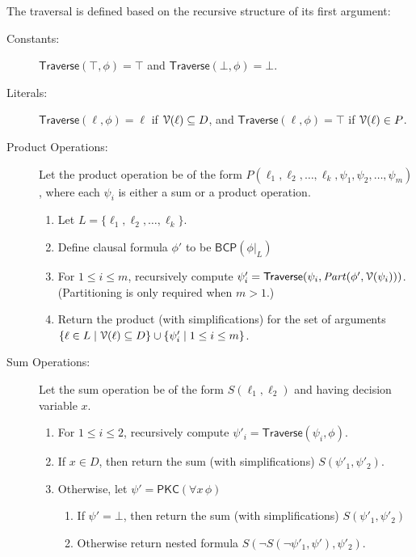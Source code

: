 \documentclass[letterpaper,USenglish,cleveref, autoref, thm-restate]{lipics-v2021}
\newcommand{\tautology}{\top}
\newcommand{\nil}{\bot}
\newcommand{\lit}{\ell}
\newcommand{\dvarset}{D}
\newcommand{\pvarset}{P}
\newcommand{\dependencyset}{{\cal V}}
\newcommand{\simplify}[2]{#1|_{#2}}
\newcommand{\ureduce}[2]{\forall #2\, #1}
\newcommand{\partition}[2]{\mathit{Part}(#1, #2)}
\newcommand{\algo}[1]{\textsf{#1}}
\newcommand{\pkc}{\algo{PKC}}
\newcommand{\traverse}{\algo{Traverse}}
\newcommand{\bcp}{\algo{BCP}}
\begin{document}
The traversal is defined based on the recursive structure of its first argument:
\begin{description}
\item[Constants:]
  $\traverse(\tautology, \phi) = \tautology$ and 
  $\traverse(\nil, \phi) = \nil$.

\item[Literals:]
  $\traverse(\lit, \phi) = \lit$ if $\dependencyset(\lit) \subseteq \dvarset$, and $\traverse(\lit, \phi) = \tautology$ if $\dependencyset(\lit) \in \pvarset$.
\item[Product Operations:]
  Let the product operation be of the form $P(\lit_1, \lit_2, \ldots, \lit_k, \psi_1, \psi_2, \ldots, \psi_m)$, where each $\psi_i$ is either a sum or a  product operation.
  \begin{enumerate}
  \item Let $L = \{\lit_1, \lit_2, \ldots, \lit_k\}$.
  \item Define clausal formula $\phi'$ to be $\bcp(\simplify{\phi}{L})$
  \item For $1 \leq i \leq m$, recursively compute $\psi'_i = \traverse(\psi_i, \partition{\phi'}{\dependencyset(\psi_i)})$.  (Partitioning is only required when $m > 1$.)
  \item Return the product (with simplifications) for the set of arguments $\{\lit \in L \mid  \dependencyset(\lit) \subseteq \dvarset\} \cup \{ \psi'_i \mid  1 \leq i \leq m \}$.
  \end{enumerate}
\item[Sum Operations:]
  Let the sum operation be of the form $S(\lit_1, \lit_2)$ and having decision variable $x$.
  \begin{enumerate}
  \item For $1 \leq i \leq 2$, recursively compute $\psi'_i = \traverse(\psi_i, \phi)$.
  \item If $x \in \dvarset$, then return the sum (with simplifications) $S(\psi'_1, \psi'_2)$.
  \item Otherwise, let $\psi' = \pkc(\ureduce{\phi}{x})$
    \begin{enumerate}
    \item If $\psi' = \nil$, then return the sum (with simplifications) $S(\psi'_1, \psi'_2)$
    \item Otherwise return nested formula $S(\neg S(\neg \psi'_1, \psi'), \psi'_2)$.
    \end{enumerate}
  \end{enumerate}
\end{description}
\end{document}
